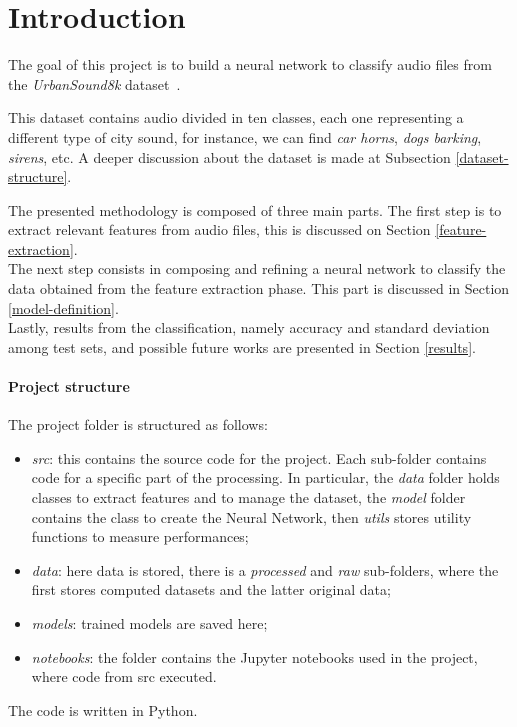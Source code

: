 \section{Introduction}

The goal of this project is to build a neural network to classify audio 
files from the \emph{UrbanSound8k} dataset~\cite{dataset}.

This dataset contains audio divided in ten classes, each one representing 
a different type of city sound, for instance, we can find \emph{car horns}, 
\emph{dogs barking}, \emph{sirens}, etc. A deeper discussion about 
the dataset is made at Subsection \vref*{dataset-structure}.

The presented methodology is composed of three main parts.
The first step is to extract relevant features from audio files, 
this is discussed on Section \vref*{feature-extraction}.\\
The next step consists in composing and refining a neural network 
to classify the data obtained from the feature extraction phase. This part is
discussed in Section \vref*{model-definition}.\\
Lastly, results from the classification, namely accuracy 
and standard deviation among test sets, and possible future works 
are presented in Section \vref*{results}.

\paragraph{Project structure}

The project folder is structured as follows:
\begin{itemize}
    \item \emph{src}: this contains the source code for the
    project. Each sub-folder contains code for a specific part of the 
    processing. In particular, the \emph{data} folder holds classes to 
    extract features and to manage the dataset, the \emph{model} folder
    contains the class to create the Neural Network, then \emph{utils} 
    stores utility functions to measure performances;
    \item \emph{data}: here data is stored, there is a \emph{processed}
    and \emph{raw} sub-folders, where the first stores computed datasets 
    and the latter original data;
    \item \emph{models}: trained models are saved here;
    \item \emph{notebooks}: the folder contains the Jupyter notebooks 
    used in the project, where code from src executed.
\end{itemize}
The code is written in Python.
\newpage